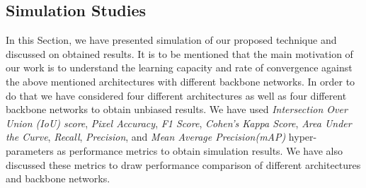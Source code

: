 \documentclass[a4paper,12pt]{spieman}  %
\begin{document}
\begin{spacing}{1}
\section{Simulation Studies}
In this Section, we have presented simulation of our proposed technique and discussed on obtained results. It is to be mentioned that the main motivation of our work is to understand the learning capacity and rate of convergence against the above mentioned architectures with different backbone networks. In order to do that we have considered four different architectures as well as four different backbone networks to obtain unbiased results. We have used \emph{Intersection Over Union (IoU) score}, \emph{Pixel Accuracy}, \emph{F1 Score}, \emph{Cohen's Kappa Score}, \emph{Area Under the Curve}, \emph{Recall}, \emph{Precision}, and \emph{Mean Average Precision(mAP)} hyper-parameters as performance metrics to obtain simulation results. We have also discussed these metrics to draw performance comparison of different architectures and backbone networks.

\end{spacing}
\end{document}
